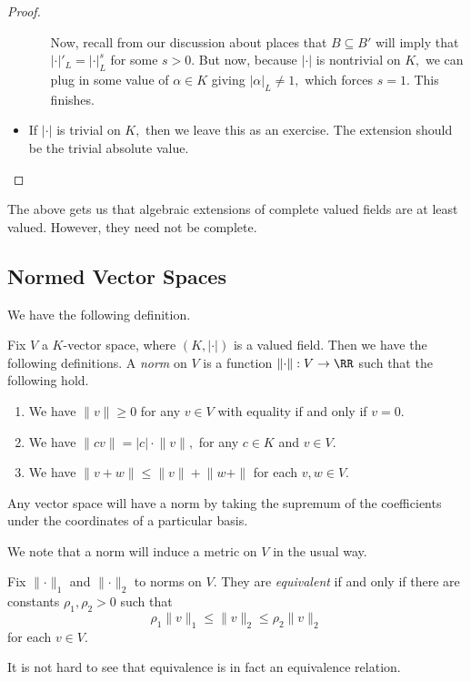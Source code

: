 \documentclass[../notes.tex]{subfiles}
\begin{document}
\begin{proof}
\begin{itemize}
\begin{enumerate}[label=(\alph*)]
			Now, recall from our discussion about places that $B\subseteq B'$ will imply that $|\cdot|'_L=|\cdot|^s_L$ for some $s>0.$ But now, because $|\cdot|$ is nontrivial on $K,$ we can plug in some value of $\alpha\in K$ giving $|\alpha|_L\ne1,$ which forces $s=1.$ This finishes.
		\end{enumerate}
		\item If $|\cdot|$ is trivial on $K,$ then we leave this as an exercise. The extension should be the trivial absolute value.
		\qedhere
	\end{itemize}
\end{proof}
The above gets us that algebraic extensions of complete valued fields are at least valued. However, they need not be complete.

\subsection{Normed Vector Spaces}
We have the following definition.
\begin{definition}
	Fix $V$ a $K$-vector space, where $(K,|\cdot|)$ is a valued field. Then we have the following definitions. A \textit{norm} on $V$ is a function $\lVert\cdot\rVert:V\to\RR$ such that the following hold.
	\begin{enumerate}[label=(\roman*)]
		\item We have $\lVert v\rVert\ge0$ for any $v\in V$ with equality if and only if $v=0.$
		\item We have $\lVert cv\rVert=|c|\cdot\lVert v\rVert,$ for any $c\in K$ and $v\in V.$
		\item We have $\lVert v+w\rVert\le\lVert v\rVert+\lVert w+\rVert$ for each $v,w\in V.$
	\end{enumerate}
\end{definition}
\begin{example}
	Any vector space will have a norm by taking the supremum of the coefficients under the coordinates of a particular basis.
\end{example}
We note that a norm will induce a metric on $V$ in the usual way.
\begin{definition}
	Fix $\lVert\cdot\rVert_1$ and $\lVert\cdot\rVert_2$ to norms on $V.$ They are \textit{equivalent} if and only if there are constants $\rho_1,\rho_2>0$ such that
	\[\rho_1\lVert v\rVert_1\le\lVert v\rVert_2\le\rho_2\lVert v\rVert_2\]
	for each $v\in V.$
\end{definition}
It is not hard to see that equivalence is in fact an equivalence relation.
\end{document}

